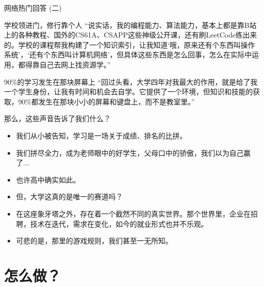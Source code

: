 \documentclass{beamer}
\begin{document}
\begin{frame}{网络热门回答 (二)}
    \begin{block}{学校领进门，修行靠个人}
    “说实话，我的编程能力、算法能力，基本上都是靠B站上的各种教程、国外的CS61A、CSAPP这些神级公开课，还有刷LeetCode练出来的。学校的课程帮我构建了一个知识索引，让我知道‘哦，原来还有个东西叫操作系统’，‘还有个东西叫计算机网络’，但具体这些东西是怎么回事，怎么在实际中运用，都得靠自己去网上找资源学。”
    \end{block}
    \begin{block}{90\%的学习发生在那块屏幕上}
    “回过头看，大学四年对我最大的作用，就是给了我一个学生身份，让我有时间和机会去自学。它提供了一个环境，但知识和技能的获取，90\%都发生在那块小小的屏幕和键盘上，而不是教室里。”
    \end{block}
\end{frame}

\begin{frame}{那么，这些声音告诉了我们什么？}
\begin{itemize}
    \item 我们从小被告知，学习是一场关于成绩、排名的比拼。
    \item 我们拼尽全力，成为老师眼中的好学生，父母口中的骄傲，我们以为自己赢了...
    \item 也许高中确实如此。
    \item \alert{但，大学这真的是唯一的赛道吗？}
    \item 在这座象牙塔之外，存在着一个截然不同的真实世界。那个世界里，企业在招聘，技术在迭代，需求在变化，如今的就业形式也并不乐观。
    \item 可悲的是，\alert{那里的游戏规则，我们甚至一无所知。}
\end{itemize}
\end{frame}

\section*{怎么做？}
\end{document}
